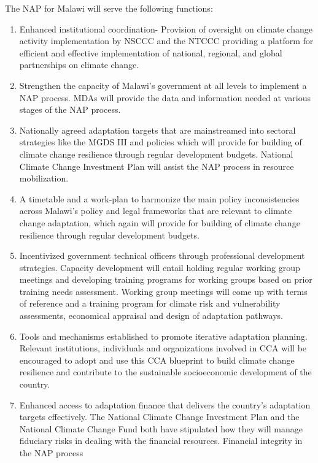 \documentclass[
]{book}
\begin{document}
The NAP for Malawi will serve the following functions:

\begin{enumerate}
\def\labelenumi{\arabic{enumi}.}
\item
  Enhanced institutional coordination- Provision of oversight on climate change activity implementation by NSCCC and the NTCCC providing a platform for
  efficient and effective implementation of national, regional, and global partnerships on climate change.
\item
  Strengthen the capacity of Malawi's government at all levels to implement a NAP process. MDAs will provide the data and information needed at various stages
  of the NAP process.
\item
  Nationally agreed adaptation targets that are mainstreamed into sectoral strategies like the MGDS III and policies which will provide for building of climate
  change resilience through regular development budgets. National Climate Change Investment Plan will assist the NAP process in resource mobilization.
\item
  A timetable and a work-plan to harmonize the main policy inconsistencies across Malawi's policy and legal frameworks that are relevant to climate change
  adaptation, which again will provide for building of climate change resilience through regular development budgets.
\item
  Incentivized government technical officers through professional development strategies. Capacity development will entail holding regular working group
  meetings and developing training programs for working groups based on prior training needs assessment. Working group meetings will come up with terms of
  reference and a training program for climate risk and vulnerability assessments, economical appraisal and design of adaptation pathways.
\item
  Tools and mechanisms established to promote iterative adaptation planning. Relevant institutions, individuals and organizations involved in CCA will be
  encouraged to adopt and use this CCA blueprint to build climate change resilience and contribute to the sustainable socioeconomic development of the country.
\item
  Enhanced access to adaptation finance that delivers the country's adaptation targets effectively. The National Climate Change Investment Plan and the National
  Climate Change Fund both have stipulated how they will manage fiduciary risks in dealing with the financial resources. Financial integrity in the NAP process

\end{enumerate}
\end{document}
